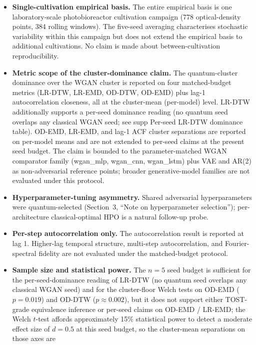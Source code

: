 \documentclass[12pt,twocolumn]{article}
\begin{document}
\begin{itemize}[nosep, leftmargin=*]
  \item \textbf{Single-cultivation empirical basis.} The entire empirical
    basis is one laboratory-scale photobioreactor cultivation campaign
    (778 optical-density points, 384 rolling windows). The five-seed
    averaging characterises stochastic variability within this campaign
    but does not extend the empirical basis to additional cultivations.
    No claim is made about between-cultivation reproducibility.
  \item \textbf{Metric scope of the cluster-dominance claim.} The
    quantum-cluster dominance over the WGAN cluster is reported on
    four matched-budget metrics (LR-DTW, LR-EMD, OD-DTW, OD-EMD) plus
    lag-1 autocorrelation closeness, all at the
    cluster-mean (per-model) level. LR-DTW additionally supports a
    per-seed dominance reading
    (no quantum seed overlaps any classical WGAN seed; see supp
    Per-seed LR-DTW dominance table). OD-EMD, LR-EMD, and lag-1 ACF
    cluster separations are reported on per-model means and are not
    extended to per-seed claims at the present seed budget. The
    claim is bounded to the parameter-matched WGAN comparator family
    (wgan\_mlp, wgan\_cnn, wgan\_lstm) plus VAE and AR(2) as
    non-adversarial reference points; broader generative-model
    families are not evaluated under this protocol.
  \item \textbf{Hyperparameter-tuning asymmetry.} Shared adversarial
    hyperparameters were quantum-selected (Section~3, ``Note on
    hyperparameter selection''); per-architecture classical-optimal
    HPO is a natural follow-up probe.
  \item \textbf{Per-step autocorrelation only.} The autocorrelation result
    is reported at lag 1. Higher-lag temporal structure, multi-step
    autocorrelation, and Fourier-spectral fidelity are not evaluated under
    the matched-budget protocol.
  \item \textbf{Sample size and statistical power.} The $n=5$ seed budget
    is sufficient for the per-seed-dominance reading of LR-DTW (no
    quantum seed overlaps any classical WGAN seed) and for the
    cluster-floor Welch tests on OD-EMD ($p = 0.019$) and OD-DTW
    ($p \approx 0.002$), but it does not support either TOST-grade
    equivalence inference or per-seed claims on OD-EMD / LR-EMD;
    the Welch $t$-test affords approximately 15\% statistical power
    to detect a moderate effect size of $d = 0.5$ at this seed
    budget, so the cluster-mean separations on those axes are

\end{itemize}
\end{document}
